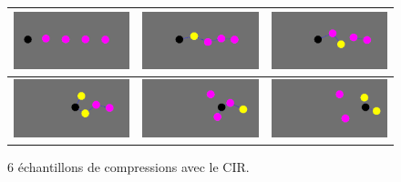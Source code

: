 \documentclass{beamer}
\begin{document}
\begin{frame}
  \begin{figure}
    \begin{center}
    \begin{tabular}{|M|M|M|}
      \hline
      \includegraphics[width=3.5cm]{Images/cir_1.png} &
      \includegraphics[width=3.5cm]{Images/cir_2.png} &
      \includegraphics[width=3.5cm]{Images/cir_3.png} \\
      \hline
      \includegraphics[width=3.5cm]{Images/cir_4.png} &
      \includegraphics[width=3.5cm]{Images/cir_5.png} &
      \includegraphics[width=3.5cm]{Images/cir_6.png} \\
      \hline
    \end{tabular}
    \end{center}
    \caption{6 échantillons de compressions avec le CIR.}
  \end{figure}
\end{frame}
\end{document}
